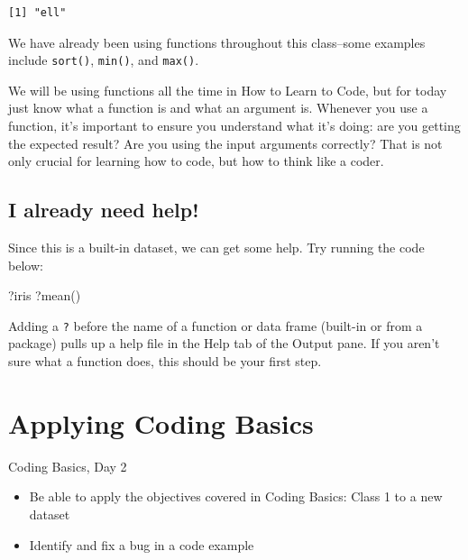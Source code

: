 \documentclass[
  letterpaper,
  DIV=11,
  numbers=noendperiod]{scrreprt}
\newenvironment{Shaded}{\begin{snugshade}}{\end{snugshade}}
\newcommand{\FunctionTok}[1]{\textcolor[rgb]{0.28,0.35,0.67}{#1}}
\newcommand{\NormalTok}[1]{\textcolor[rgb]{0.00,0.23,0.31}{#1}}
\begin{document}
\begin{verbatim}
[1] "ell"
\end{verbatim}

We have already been using functions throughout this class--some
examples include \texttt{sort()}, \texttt{min()}, and \texttt{max()}.

We will be using functions all the time in How to Learn to Code, but for
today just know what a function is and what an argument is. Whenever you
use a function, it's important to ensure you understand what it's doing:
are you getting the expected result? Are you using the input arguments
correctly? That is not only crucial for learning how to code, but how to
think like a coder.

\hypertarget{i-already-need-help}{%
\section{I already need help!}\label{i-already-need-help}}

Since this is a built-in dataset, we can get some help. Try running the
code below:

\begin{Shaded}
\begin{Highlighting}[]
\NormalTok{?iris}
\NormalTok{?}\FunctionTok{mean}\NormalTok{()}
\end{Highlighting}
\end{Shaded}

Adding a \texttt{?} before the name of a function or data frame
(built-in or from a package) pulls up a help file in the Help tab of the
Output pane. If you aren't sure what a function does, this should be
your first step.


\hypertarget{applying-coding-basics}{%
\chapter{Applying Coding Basics}\label{applying-coding-basics}}

Coding Basics, Day 2

\hfill\break

\begin{itemize}
\item
  Be able to apply the objectives covered in Coding Basics: Class 1 to a
  new dataset
\item
  Identify and fix a bug in a code example
\end{itemize}
\end{document}
